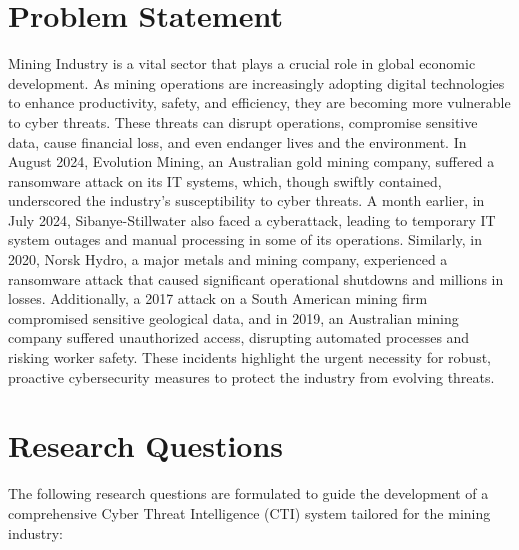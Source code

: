 \documentclass[a4paper,twoside,12pt]{report}
\begin{document}
\section{Problem Statement}
Mining Industry is a vital sector that plays a crucial role in global economic development. As
mining operations are increasingly adopting digital technologies to enhance productivity,
safety, and efficiency, they are becoming more vulnerable to cyber threats. These threats can
disrupt operations, compromise sensitive data, cause financial loss, and even endanger lives
and the environment.
In August 2024, Evolution Mining, an Australian gold mining company, suffered a ransomware
attack on its IT systems, which, though swiftly contained, underscored the industry's
susceptibility to cyber threats. A month earlier, in July 2024, Sibanye-Stillwater also faced a
cyberattack, leading to temporary IT system outages and manual processing in some of its
operations. Similarly, in 2020, Norsk Hydro, a major metals and mining company, experienced
a ransomware attack that caused significant operational shutdowns and millions in losses.
Additionally, a 2017 attack on a South American mining firm compromised sensitive geological
data, and in 2019, an Australian mining company suffered unauthorized access, disrupting
automated processes and risking worker safety.
These incidents highlight the urgent necessity for robust, proactive cybersecurity measures to
protect the industry from evolving threats.





\section{Research Questions}

The following research questions are formulated to guide the development of a comprehensive Cyber Threat Intelligence (CTI) system tailored for the mining industry:
\end{document}
